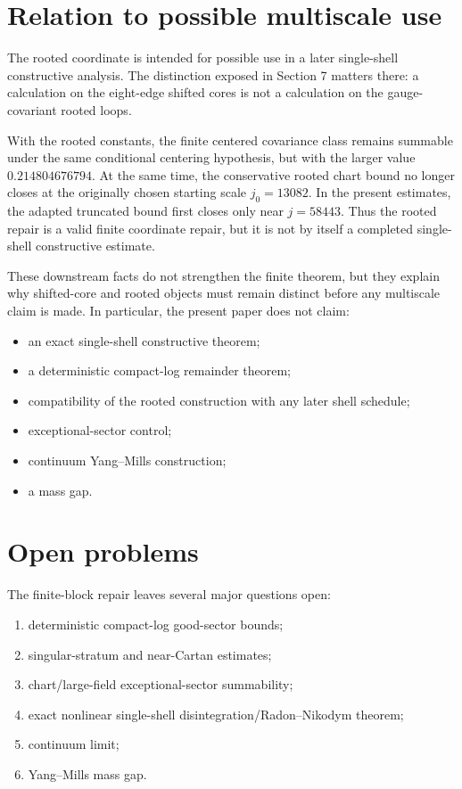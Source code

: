 \documentclass[10pt]{article}
\begin{document}
\section{Relation to possible multiscale use}

The rooted coordinate is intended for possible use in a later single-shell constructive analysis.  The distinction exposed in Section 7 matters there: a calculation on the eight-edge shifted cores is not a calculation on the gauge-covariant rooted loops.

With the rooted constants, the finite centered covariance class remains summable under the same conditional centering hypothesis, but with the larger value \(0.214804676794\).  At the same time, the conservative rooted chart bound no longer closes at the originally chosen starting scale \(j_0=13082\).  In the present estimates, the adapted truncated bound first closes only near \(j=58443\).  Thus the rooted repair is a valid finite coordinate repair, but it is not by itself a completed single-shell constructive estimate.

These downstream facts do not strengthen the finite theorem, but they explain why shifted-core and rooted objects must remain distinct before any multiscale claim is made.  In particular, the present paper does not claim:

\begin{itemize}[leftmargin=*]
\item an exact single-shell constructive theorem;
\item a deterministic compact-log remainder theorem;
\item compatibility of the rooted construction with any later shell schedule;
\item exceptional-sector control;
\item continuum Yang--Mills construction;
\item a mass gap.
\end{itemize}

\section{Open problems}

The finite-block repair leaves several major questions open:

\begin{enumerate}[leftmargin=*]
\item deterministic compact-log good-sector bounds;
\item singular-stratum and near-Cartan estimates;
\item chart/large-field exceptional-sector summability;
\item exact nonlinear single-shell disintegration/Radon--Nikodym theorem;
\item continuum limit;
\item Yang--Mills mass gap.
\end{enumerate}
\end{document}
